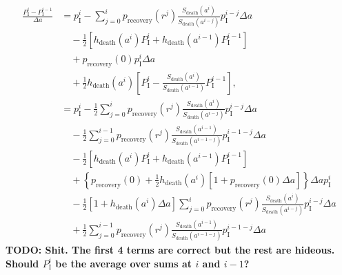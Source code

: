 \documentclass[12pt]{article}
\begin{document}
\begin{equation}
  \begin{split}
    \frac{P_{\mathrm{I}}^i - P_{\mathrm{I}}^{i - 1}}{\Delta a}
    &= p_{\mathrm{I}}^i
    - \sum_{j = 0}^i p_{\text{recovery}}(r^j)
    \frac{S_{\text{death}}(a^i)}{S_{\text{death}}(a^{i - j})}
    p_{\mathrm{I}}^{i - j} \Delta a
    \\ & \quad {}
    - \frac{1}{2} \left[h_{\text{death}}(a^i) P_{\mathrm{I}}^i
      + h_{\text{death}}(a^{i - 1}) P_{\mathrm{I}}^{i - 1}\right]
    \\ & \quad {}
    + p_{\text{recovery}}(0) p_{\mathrm{I}}^i \Delta a
    \\ & \quad {}
    + \frac{1}{2} h_{\text{death}}(a^i)
    \left[P_{\mathrm{I}}^i
      - \frac{S_{\text{death}}(a^i)}{S_{\text{death}}(a^{i - 1})}
      P_{\mathrm{I}}^{i - 1}\right],
    \\
    &= p_{\mathrm{I}}^i
    - \frac{1}{2} \sum_{j = 0}^i
    p_{\text{recovery}}(r^j)
    \frac{S_{\text{death}}(a^i)}{S_{\text{death}}(a^{i - j})}
    p_{\mathrm{I}}^{i - j}
    \Delta a
    \\ & \quad {}
    - \frac{1}{2} \sum_{j = 0}^{i - 1}
    p_{\text{recovery}}(r^j)
    \frac{S_{\text{death}}(a^{i - 1})}{S_{\text{death}}(a^{i - 1 - j})}
    p_{\mathrm{I}}^{i - 1 - j}
    \Delta a
    \\ & \quad {}
    - \frac{1}{2} \left[h_{\text{death}}(a^i) P_{\mathrm{I}}^i
      + h_{\text{death}}(a^{i - 1}) P_{\mathrm{I}}^{i - 1}\right]
    \\ & \quad {}
    + \left\{
      p_{\text{recovery}}(0)
      + \frac{1}{2} h_{\text{death}}(a^i)
      \left[1 + p_{\text{recovery}}(0) \Delta a \right]
    \right\} \Delta a p_{\mathrm{I}}^i
    \\ & \quad {}
    - \frac{1}{2}
    \left[1 + h_{\text{death}}(a^i) \Delta a\right]
    \sum_{j = 0}^i p_{\text{recovery}}(r^j)
    \frac{S_{\text{death}}(a^i)}{S_{\text{death}}(a^{i - j})}
    p_{\mathrm{I}}^{i - j} \Delta a
    \\ & \quad {}
    + \frac{1}{2} \sum_{j = 0}^{i - 1}
    p_{\text{recovery}}(r^j)
    \frac{S_{\text{death}}(a^{i - 1})}{S_{\text{death}}(a^{i - 1 - j})}
    p_{\mathrm{I}}^{i - 1 - j}
    \Delta a
  \end{split}
\end{equation}
\textbf{TODO: Shit. The first 4 terms are correct but the rest are
  hideous. Should $P_{\mathrm{I}}^i$ be the average over sums at $i$
  and $i - 1$?}
\end{document}
